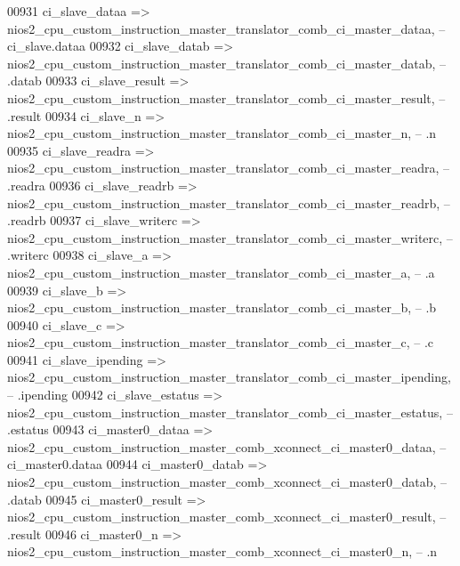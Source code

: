 \begin{DoxyCode}
00931             ci\_slave\_dataa      => 
      nios2_cpu_custom_instruction_master_translator_comb_ci_master_dataa,\textcolor{keyword}{    --   ci\_slave.dataa}
00932             ci\_slave\_datab      => 
      nios2_cpu_custom_instruction_master_translator_comb_ci_master_datab,\textcolor{keyword}{    --           .datab}
00933             ci\_slave\_result     => 
      nios2_cpu_custom_instruction_master_translator_comb_ci_master_result,\textcolor{keyword}{   --           .result}
00934             ci\_slave\_n          => 
      nios2_cpu_custom_instruction_master_translator_comb_ci_master_n,\textcolor{keyword}{        --           .n}
00935             ci\_slave\_readra     => 
      nios2_cpu_custom_instruction_master_translator_comb_ci_master_readra,\textcolor{keyword}{   --           .readra}
00936             ci\_slave\_readrb     => 
      nios2_cpu_custom_instruction_master_translator_comb_ci_master_readrb,\textcolor{keyword}{   --           .readrb}
00937             ci\_slave\_writerc    => 
      nios2_cpu_custom_instruction_master_translator_comb_ci_master_writerc,\textcolor{keyword}{  --           .writerc}
00938             ci\_slave\_a          => 
      nios2_cpu_custom_instruction_master_translator_comb_ci_master_a,\textcolor{keyword}{        --           .a}
00939             ci\_slave\_b          => 
      nios2_cpu_custom_instruction_master_translator_comb_ci_master_b,\textcolor{keyword}{        --           .b}
00940             ci\_slave\_c          => 
      nios2_cpu_custom_instruction_master_translator_comb_ci_master_c,\textcolor{keyword}{        --           .c}
00941             ci\_slave\_ipending   => 
      nios2_cpu_custom_instruction_master_translator_comb_ci_master_ipending,\textcolor{keyword}{ --           .ipending}
00942             ci\_slave\_estatus    => 
      nios2_cpu_custom_instruction_master_translator_comb_ci_master_estatus,\textcolor{keyword}{  --           .estatus}
00943             ci\_master0\_dataa    => 
      nios2_cpu_custom_instruction_master_comb_xconnect_ci_master0_dataa,\textcolor{keyword}{     -- ci\_master0.dataa}
00944             ci\_master0\_datab    => 
      nios2_cpu_custom_instruction_master_comb_xconnect_ci_master0_datab,\textcolor{keyword}{     --           .datab}
00945             ci\_master0\_result   => 
      nios2_cpu_custom_instruction_master_comb_xconnect_ci_master0_result,\textcolor{keyword}{    --           .result}
00946             ci\_master0\_n        => 
      nios2_cpu_custom_instruction_master_comb_xconnect_ci_master0_n,\textcolor{keyword}{         --           .n}

\end{DoxyCode}
